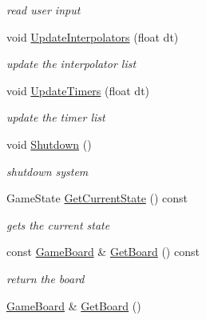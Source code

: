 \begin{DoxyCompactItemize}
\begin{DoxyCompactList}\small\item\em read user input \end{DoxyCompactList}\item 
\hypertarget{class_game_logic_a97ea86d882696b29db897a2437b0ede3}{void \hyperlink{class_game_logic_a97ea86d882696b29db897a2437b0ede3}{Update\-Interpolators} (float dt)}\label{class_game_logic_a97ea86d882696b29db897a2437b0ede3}

\begin{DoxyCompactList}\small\item\em update the interpolator list \end{DoxyCompactList}\item 
\hypertarget{class_game_logic_a238affbc72e0f37a44721466616ab4d7}{void \hyperlink{class_game_logic_a238affbc72e0f37a44721466616ab4d7}{Update\-Timers} (float dt)}\label{class_game_logic_a238affbc72e0f37a44721466616ab4d7}

\begin{DoxyCompactList}\small\item\em update the timer list \end{DoxyCompactList}\item 
\hypertarget{class_game_logic_af03f3566b70ec7b3a69dca8c27b59dcc}{void \hyperlink{class_game_logic_af03f3566b70ec7b3a69dca8c27b59dcc}{Shutdown} ()}\label{class_game_logic_af03f3566b70ec7b3a69dca8c27b59dcc}

\begin{DoxyCompactList}\small\item\em shutdown system \end{DoxyCompactList}\item 
\hypertarget{class_game_logic_a27fda434e0476678c8dcaf320b5b0f79}{Game\-State \hyperlink{class_game_logic_a27fda434e0476678c8dcaf320b5b0f79}{Get\-Current\-State} () const }\label{class_game_logic_a27fda434e0476678c8dcaf320b5b0f79}

\begin{DoxyCompactList}\small\item\em gets the current state \end{DoxyCompactList}\item 
\hypertarget{class_game_logic_ac40d6698b0cad9a53df29d6152f27fe4}{const \hyperlink{class_game_board}{Game\-Board} \& \hyperlink{class_game_logic_ac40d6698b0cad9a53df29d6152f27fe4}{Get\-Board} () const }\label{class_game_logic_ac40d6698b0cad9a53df29d6152f27fe4}

\begin{DoxyCompactList}\small\item\em return the board \end{DoxyCompactList}\item 
\hypertarget{class_game_logic_a4042ff7e0b73cbe2e7fe45ed17cdc51d}{\hyperlink{class_game_board}{Game\-Board} \& \hyperlink{class_game_logic_a4042ff7e0b73cbe2e7fe45ed17cdc51d}{Get\-Board} ()}\label{class_game_logic_a4042ff7e0b73cbe2e7fe45ed17cdc51d}


\end{DoxyCompactItemize}
